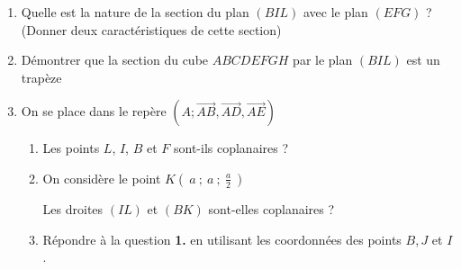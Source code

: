 \documentclass[12pt,a4paper,french]{article}
\begin{document}
\begin{question}
\begin{enumerate}[itemsep=8pt]
\item Quelle est la nature de la section du plan $(BIL)$ avec le plan $(EFG)$ ?(Donner deux caractéristiques de cette section)

\item Démontrer que la section du cube $ABCDEFGH$ par le plan $(BIL)$ est un trapèze

\item On se place dans  le repère
    $(A;\overrightarrow{AB},\overrightarrow{AD},\overrightarrow{AE})$

\begin{enumerate}[itemsep=5pt]
\item Les points $L$, $I$, $B$ et $F$ sont-ils coplanaires ? 
\item On considère le point  $K (~a~;~a~;~\frac{a}{2}~)$

Les droites $(IL)$ et $(BK)$ sont-elles coplanaires ?
\item Répondre à la question {\bf1.} en utilisant les coordonnées des points $B$,\,$J$ et $I$.
\end{enumerate}
\end{enumerate}

\end{question}
\end{document}
